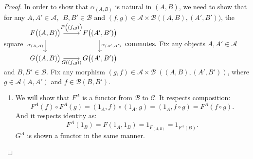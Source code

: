 \documentclass[a4paper]{article}
\theoremstyle{definition}
\begin{document}
	\begin{proof} \setcounter{equation}{0}
		In order to show that $\alpha_{(A,B)}$ is natural in $(A,B)$,
		we need to show that for any $A,A' \in \mathcal{A}$, $\; B,B' \in \mathcal{B}$
		and $(f,g) \in \mathcal{A} \times \mathcal{B} \; \Big((A,B),(A',B')\Big)$,
		the square
		$\begin{tikzcd}
			F\big((A,B)\big) \arrow[swap]{d}{\alpha_{(A,B)}} \arrow{r}{F\big((f,g)\big)}
		& F\big((A',B')\big) \arrow{d}{\alpha_{(A',B')}}\\
		G\big((A,B)\big) \arrow[swap]{r}{G((f,g))}
		& G\big((A',B')\big)
		\end{tikzcd} \text{ commutes.}$
		Fix any objects $A,A' \in \mathcal{A} $ and $B,B' \in \mathcal{B} $.
		Fix any morphism $(g,f) \in \mathcal{A} \times \mathcal{B} \; ((A,B),(A',B'))$,
		where $g \in \mathcal{A} (A,A')$ and $f \in \mathcal{B} (B,B')$.
		\begin{enumerate}[label=(\Roman*)]
			\item We will show that $F^A$ is a functor from $\mathcal{B} $ to $\mathcal{C}$.
				It respects composition:
				\[F^A(f)\circ F^A(g)=(1_A,f)\circ(1_A,g)=(1_A,f\circ g)=F^A(f\circ g).\]
				And it respects identity as:
				\[F^A(1_B)=F(1_A,1_B)=1_{F_{(A,B)}}=1_{F^A(B)}.\]
				$G^A$ is shown a functor in the same manner.


\end{enumerate}
\end{proof}
\end{document}
